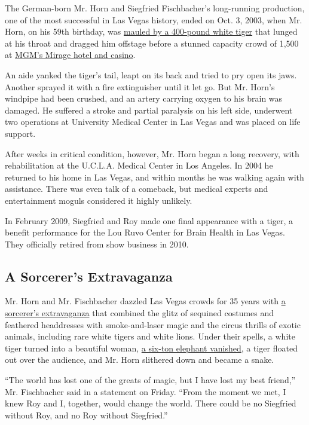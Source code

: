 The German-born Mr. Horn and Siegfried Fischbacher's long-running
production, one of the most successful in Las Vegas history, ended on
Oct. 3, 2003, when Mr. Horn, on his 59th birthday, was
\href{https://www.nytimes.com/2003/10/06/us/onstage-attack-casts-pall-over-las-vegas-strip.html}{mauled
by a 400-pound white tiger} that lunged at his throat and dragged him
offstage before a stunned capacity crowd of 1,500 at
\href{https://mirage.mgmresorts.com/en.html}{MGM's Mirage hotel and
casino}.

An aide yanked the tiger's tail, leapt on its back and tried to pry open
its jaws. Another sprayed it with a fire extinguisher until it let go.
But Mr. Horn's windpipe had been crushed, and an artery carrying oxygen
to his brain was damaged. He suffered a stroke and partial paralysis on
his left side, underwent two operations at University Medical Center in
Las Vegas and was placed on life support.

After weeks in critical condition, however, Mr. Horn began a long
recovery, with rehabilitation at the U.C.L.A. Medical Center in Los
Angeles. In 2004 he returned to his home in Las Vegas, and within months
he was walking again with assistance. There was even talk of a comeback,
but medical experts and entertainment moguls considered it highly
unlikely.

In February 2009, Siegfried and Roy made one final appearance with a
tiger, a benefit performance for the Lou Ruvo Center for Brain Health in
Las Vegas. They officially retired from show business in 2010.

\hypertarget{a-sorcerers-extravaganza}{%
\subsection{A Sorcerer's Extravaganza}\label{a-sorcerers-extravaganza}}

Mr. Horn and Mr. Fischbacher dazzled Las Vegas crowds for 35 years with
\href{https://www.youtube.com/watch?v=jun11ng8WaM}{a sorcerer's
extravaganza} that combined the glitz of sequined costumes and feathered
headdresses with smoke-and-laser magic and the circus thrills of exotic
animals, including rare white tigers and white lions. Under their
spells, a white tiger turned into a beautiful woman,
\href{https://www.youtube.com/watch?v=Vk48Dry8KzY}{a six-ton elephant
vanished}, a tiger floated out over the audience, and Mr. Horn slithered
down and became a snake.

``The world has lost one of the greats of magic, but I have lost my best
friend,'' Mr. Fischbacher said in a statement on Friday. ``From the
moment we met, I knew Roy and I, together, would change the world. There
could be no Siegfried without Roy, and no Roy without Siegfried.''


